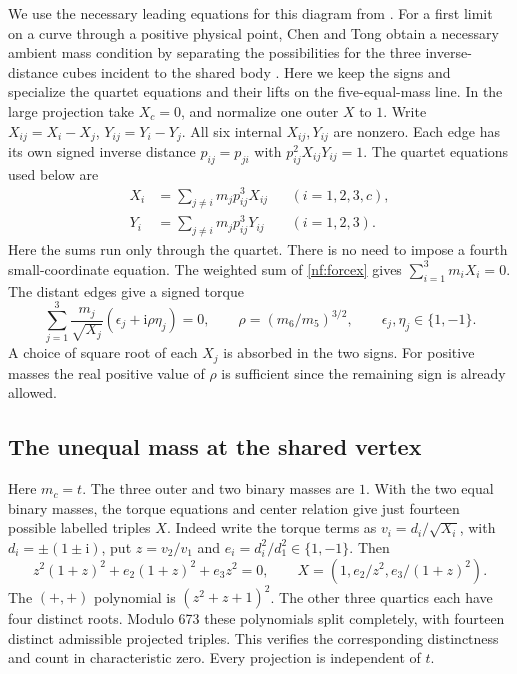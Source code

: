 \documentclass[11pt,letterpaper]{article}
\theoremstyle{definition}
\begin{document}
We use the necessary leading equations for this diagram from
\cite[\S6.7, Lemmas 6.16(b) and 6.17(b)]{Tomar}.
For a first limit on a curve through a positive physical point, Chen and Tong obtain a necessary ambient mass condition by separating the possibilities for the three inverse-distance cubes incident to the shared body \cite[Prop.~5.20]{CT}. Here we keep the signs and specialize the quartet equations and their lifts on the five-equal-mass line.
In the large projection take $X_c=0$, and normalize one outer $X$ to $1$.
Write $X_{ij}=X_i-X_j$, $Y_{ij}=Y_i-Y_j$.
All six internal $X_{ij},Y_{ij}$ are nonzero. Each edge has its own signed inverse
distance $p_{ij}=p_{ji}$ with $p_{ij}^2X_{ij}Y_{ij}=1$.
The quartet equations used below are
\begin{align}
 X_i&=\sum_{j\ne i}m_j p_{ij}^3 X_{ij} && (i=1,2,3,c),\label{nf:forcex}\\
 Y_i&=\sum_{j\ne i}m_j p_{ij}^3 Y_{ij} && (i=1,2,3).\label{nf:forcey}
\end{align}
Here the sums run only through the quartet. There is no need to impose a
fourth small-coordinate equation. The weighted sum of \eqref{nf:forcex}
gives $\sum_{i=1}^3m_iX_i=0$. The distant edges give a signed torque
\begin{equation}\label{nf:torque}
 \sum_{j=1}^3 \frac{m_j}{\sqrt{X_j}}
 (\epsilon_j+\mathrm i\rho\eta_j)=0,\qquad
 \rho=(m_6/m_5)^{3/2},\qquad \epsilon_j,\eta_j\in\{1,-1\}.
\end{equation}
A choice of square root of each $X_j$ is absorbed in the two signs.
For positive masses the real positive value of $\rho$ is sufficient since
the remaining sign is already allowed.

\subsection{The unequal mass at the shared vertex}\label{nf:center}
Here $m_c=t$. The three outer and two binary masses are $1$.
With the two equal binary masses, the torque equations and center relation give just fourteen possible labelled triples $X$. Indeed write the torque terms as $v_i=d_i/\sqrt{X_i}$, with $d_i=\pm(1\pm\mathrm i)$, put $z=v_2/v_1$ and $e_i=d_i^2/d_1^2\in\{1,-1\}$. Then
\[
z^2(1+z)^2+e_2(1+z)^2+e_3 z^2=0,\qquad
X=(1,e_2/z^2,e_3/(1+z)^2).
\]
The $(+,+)$ polynomial is $(z^2+z+1)^2$. The other three quartics each have four distinct roots. Modulo 673 these polynomials split completely, with fourteen distinct admissible projected triples. This verifies the corresponding distinctness and count in characteristic zero. Every projection is independent of $t$.
\end{document}
